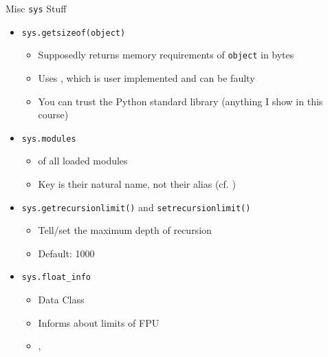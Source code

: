 
\begin{frame}{Misc \texttt{sys} Stuff}
%
\begin{itemize}
\item \texttt{sys.getsizeof(object)}
	\begin{itemize}
	\item Supposedly returns memory requirements of \texttt{object} in bytes
	\item Uses , which is user implemented and can be faulty
	\item You can trust the Python standard library (anything I show in this course)
	\end{itemize}
\item \texttt{sys.modules}
	\begin{itemize}
	\item {} of all loaded modules
	\item Key is their natural name, not their alias (cf. )
	\end{itemize}
\item \texttt{sys.getrecursionlimit()} and \texttt{setrecursionlimit()}
	\begin{itemize}
	\item Tell/set the maximum depth of recursion
	\item Default: 1000
	\end{itemize}
\item \texttt{sys.float\_info}
	\begin{itemize}
	\item Data Class
	\item Informs about limits of FPU
	\item {}, 
	\end{itemize}
\end{itemize}
%
\end{frame}


